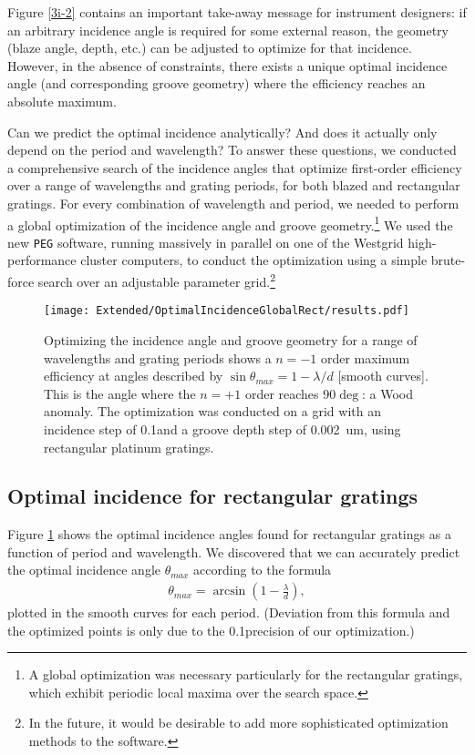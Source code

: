 Figure \ref{3i-2} contains an important take-away message for instrument designers: if an arbitrary incidence angle is required for some external reason, the geometry (blaze angle, depth, etc.) can be adjusted to optimize for that incidence. However, in the absence of constraints, there exists a unique optimal incidence angle (and corresponding groove geometry) where the efficiency reaches an absolute maximum.

Can we predict the optimal incidence analytically?  And does it actually only depend on the period and wavelength?  To answer these questions, we conducted a comprehensive search of the incidence angles that optimize first-order efficiency over a range of wavelengths and grating periods, for both blazed and rectangular gratings.  For every combination of wavelength and period, we needed to perform a global optimization of the incidence angle and groove geometry.\footnote{A global optimization was necessary particularly for the rectangular gratings, which exhibit periodic local maxima over the search space.}  We used the new \texttt{PEG} software, running massively in parallel on one of the Westgrid high-performance cluster computers, to conduct the optimization using a simple brute-force search over an adjustable parameter grid.\footnote{In the future, it would be desirable to add more sophisticated optimization methods to the software.}

\begin{figure}[htbp] %
   \centering
   \texttt{[image: Extended/OptimalIncidenceGlobalRect/results.pdf]} 
   \caption[Optimizing the incidence angle and groove geometry for a range of wavelengths and grating periods shows a $n=-1$ order maximum at the $n=+1$ order Wood anomaly: $\sin \theta_{max} = 1 - \lambda/d$.]{Optimizing the incidence angle and groove geometry for a range of wavelengths and grating periods shows a $n=-1$ order maximum efficiency at angles described by $\sin \theta_{max} = 1 - \lambda/d$ [smooth curves].  This is the angle where the $n=+1$ order reaches $90\deg$: a Wood anomaly.  The optimization was conducted on a grid with an incidence step of 0.1\dg and a groove depth step of 0.002~um, using rectangular platinum gratings.}
   \label{rectIncidenceOpt}
\end{figure}

\subsection{Optimal incidence for rectangular gratings}
Figure \ref{rectIncidenceOpt} shows the optimal incidence angles found for rectangular gratings as a function of period and wavelength.  We discovered that we can accurately predict the optimal incidence angle $\theta_{max}$ according to the formula
\begin{align}
\label{rectOptimalIncidence}
\theta_{max} = \arcsin \left( 1 - \frac{\lambda}{d} \right),
\end{align}
plotted in the smooth curves for each period.  (Deviation from this formula and the optimized points is only due to the 0.1\dg precision of our optimization.)

